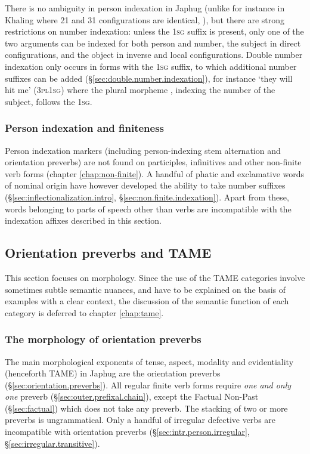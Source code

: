 There is no ambiguity in person indexation in Japhug (unlike for instance in Khaling where 2\fl{}1 and 3\fl{}1 configurations are identical, \citealt{jacques12khaling}), but there are strong restrictions on number indexation: unless the \textsc{1sg} suffix is present, only one of the two arguments can be indexed for both person and number, the subject in direct configurations, and the object in inverse and local configurations. Double number indexation only occurs in forms with the \textsc{1sg}  suffix, to which additional number suffixes can be added (§\ref{sec:double.number.indexation}), for instance   `they will hit me' (\textsc{3pl}\fl{}\textsc{1sg}) where the plural morpheme , indexing the number of the subject, follows the \textsc{1sg}.

\subsubsection{Person indexation and finiteness} \label{sec:indexation.finiteness.intro}
Person indexation markers (including person-indexing stem alternation and orientation preverbs) are not found on participles, infinitives and other non-finite verb forms (chapter \ref{chap:non-finite}). A handful of phatic and exclamative words of nominal origin have however developed the ability to take number suffixes (§\ref{sec:inflectionalization.intro}, §\ref{sec:non.finite.indexation}). Apart from these, words belonging to parts of speech other than verbs are incompatible with the indexation affixes described in this section.


\subsection{Orientation preverbs and TAME}
This section focuses on morphology. Since the use of the TAME categories involve sometimes subtle semantic nuances, and have to be explained on the basis of examples with a clear context, the discussion of the semantic function of each category is deferred to chapter \ref{chap:tame}.

\subsubsection{The morphology of orientation preverbs}
The main morphological exponents of tense, aspect, modality and evidentiality (henceforth TAME) in Japhug are the orientation preverbs (§\ref{sec:orientation.preverbs}). All regular finite verb forms require \textit{one and only one} preverb (§\ref{sec:outer.prefixal.chain}), except the Factual Non-Past (§\ref{sec:factual}) which does not take any preverb. The stacking of two or more preverbs is ungrammatical. Only a handful of irregular defective verbs are incompatible with orientation preverbs (§\ref{sec:intr.person.irregular}, §\ref{sec:irregular.transitive}).

